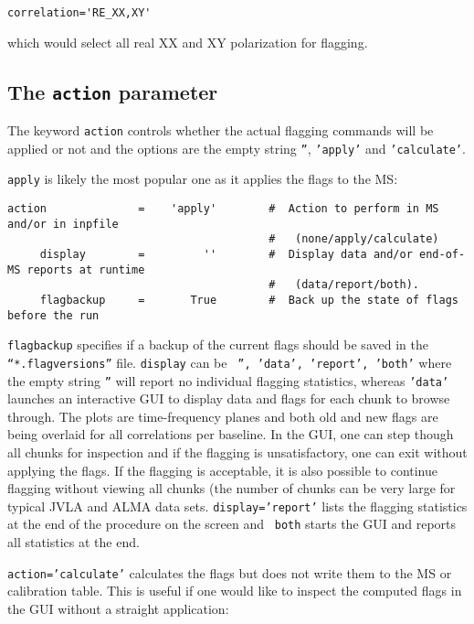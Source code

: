 \small
\begin{verbatim}
correlation='RE_XX,XY'
\end{verbatim}
\normalsize

which would select all real XX and XY polarization for flagging. 

\subsection{The {\tt action} parameter}
\label{section:edit.flagdata.action}

The keyword {\tt action} controls whether the actual flagging
commands will be applied or not and the options are the empty string
{\tt ''}, {\tt 'apply'} and {\tt 'calculate'}.

{\tt apply} is likely the most popular one as it applies the flags to the MS:
\small
\begin{verbatim}
action              =    'apply'        #  Action to perform in MS and/or in inpfile
                                        #   (none/apply/calculate)
     display        =         ''        #  Display data and/or end-of-MS reports at runtime
                                        #   (data/report/both).
     flagbackup     =       True        #  Back up the state of flags before the run
\end{verbatim}
\normalsize

{\tt flagbackup} specifies if a backup of the current flags should be
saved in the {\tt ``*.flagversions''} file. {\tt display} can be {\tt
  '', 'data', 'report', 'both'} where the empty string {\tt ''} will
report no individual flagging statistics, whereas {\tt 'data'}
launches an interactive GUI to display data and flags for each chunk to
browse through. The plots are time-frequency planes and both old and
new flags are being overlaid for all correlations per baseline. In the
GUI, one can step though all chunks for inspection and if the flagging
is unsatisfactory, one can exit without applying the flags. If the
flagging is acceptable, it is also possible to continue flagging
without viewing all chunks (the number of chunks can be very large for
typical JVLA and ALMA data sets. {\tt display='report'} lists the
flagging statistics at the end of the procedure on the screen and {\tt
  both} starts the GUI and reports all statistics at the end.


{\tt action='calculate'} calculates the flags but does not write them
to the MS or calibration table. This is useful if one would like to
inspect the computed flags in the GUI without a straight application:

